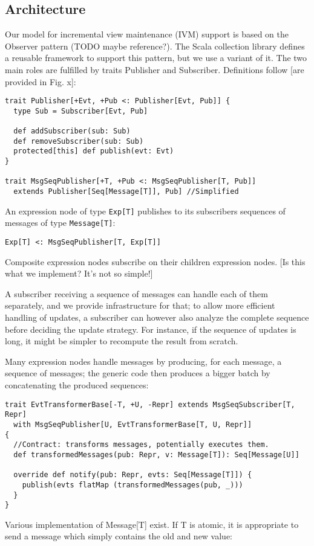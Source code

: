 \documentclass{article}
\begin{document}
\subsection{Architecture}

Our model for incremental view maintenance (IVM) support is based on the
Observer pattern (TODO maybe reference?). The Scala collection library
defines a reusable framework to support this pattern, but we use a
variant of it. The two main roles are fulfilled by traits Publisher and
Subscriber. Definitions follow {[}are provided in Fig. x{]}:

\begin{verbatim}
trait Publisher[+Evt, +Pub <: Publisher[Evt, Pub]] {
  type Sub = Subscriber[Evt, Pub]

  def addSubscriber(sub: Sub)
  def removeSubscriber(sub: Sub)
  protected[this] def publish(evt: Evt)
}

trait MsgSeqPublisher[+T, +Pub <: MsgSeqPublisher[T, Pub]]
  extends Publisher[Seq[Message[T]], Pub] //Simplified
\end{verbatim}
An expression node of type \texttt{Exp{[}T{]}} publishes to its
subscribers sequences of messages of type \texttt{Message{[}T{]}}:

\texttt{Exp{[}T{]} \textless{}: MsgSeqPublisher{[}T, Exp{[}T{]}{]}}

Composite expression nodes subscribe on their children expression nodes.
{[}Is this what we implement? It's not so simple!{]}

A subscriber receiving a sequence of messages can handle each of them
separately, and we provide infrastructure for that; to allow more
efficient handling of updates, a subscriber can however also analyze the
complete sequence before deciding the update strategy. For instance, if
the sequence of updates is long, it might be simpler to recompute the
result from scratch.

Many expression nodes handle messages by producing, for each message, a
sequence of messages; the generic code then produces a bigger batch by
concatenating the produced sequences:

\begin{verbatim}
trait EvtTransformerBase[-T, +U, -Repr] extends MsgSeqSubscriber[T, Repr]
  with MsgSeqPublisher[U, EvtTransformerBase[T, U, Repr]]
{
  //Contract: transforms messages, potentially executes them.
  def transformedMessages(pub: Repr, v: Message[T]): Seq[Message[U]]

  override def notify(pub: Repr, evts: Seq[Message[T]]) {
    publish(evts flatMap (transformedMessages(pub, _)))
  }
}
\end{verbatim}
Various implementation of Message{[}T{]} exist. If T is atomic, it is
appropriate to send a message which simply contains the old and new
value:
\end{document}
